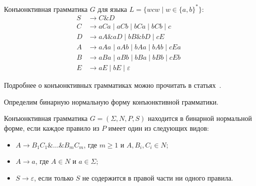 
\begin{example}
    Конъюнктивная грамматика $G$ для языка $L = \{wcw \mid w \in \{a, b\}^*\}$:
    \begin{align*}
    S &\to C \& D \\
    C &\to aCa \mid aCb \mid bCa \mid bCb \mid c \\
    D &\to aA\&aD \mid bB\&bD \mid cE \\
    A &\to aAa \mid aAb \mid bAa \mid bAb \mid cEa \\
    B &\to aBa \mid aBb \mid bBa \mid bBb \mid cEb \\
    E &\to aE \mid bE \mid \varepsilon
    \end{align*}
\end{example}

Подробнее о конъюнктивных грамматиках можно прочитать в статьях~\cite{DBLP:journals/jalc/Okhotin01, Okhotin2002, DBLP:journals/tcs/Okhotin03a, f60a33d409364914be560cac0e54b12c}.

Определим бинарную нормальную форму конъюнктивной грамматики.

\begin{definition}
    Конъюнктивная грамматика $G = (\Sigma, N, P, S)$ находится в бинарной нормальной форме, если каждое правило из $P$ имеет один из следующих видов:
    \begin{itemize}
        \item $A \rightarrow B_1 C_1 \& \ldots \& B_m C_m$, где $m \geqslant 1$ и $A,B_i,C_i \in N$;
        \item $A \rightarrow a$, где $A \in N$ и $a \in \Sigma$;
        \item $S \rightarrow \varepsilon$, если только $S$ не содержится в правой части ни одного правила.
    \end{itemize}
\end{definition}

